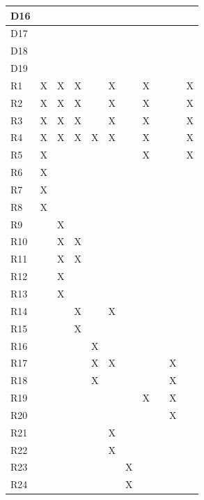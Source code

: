\documentclass{article}
\begin{document}
\begin{longtable}[c]{|m{0.15cm}|m{0.15cm}|m{0.15cm}|m{0.15cm}|m{0.15cm}|m{0.15cm}|m{0.15cm}|m{0.15cm}|m{0.15cm}|m{0.15cm}|m{0.15cm}|}
 \hline
 D16 &   &   &   &   &   &   &   &   &   &   \\
 \hline
 D17 &   &   &   &   &   &   &   &   &   &   \\
 \hline
 D18 &   &   &   &   &   &   &   &   &   &   \\
 \hline
 D19 &   &   &   &   &   &   &   &   &   &   \\
 \hline
 R1 & X & X & X &   & X &   & X &   &   & X \\
 \hline
 R2 & X & X & X &   & X &   & X &   &   & X \\
 \hline
 R3 & X & X & X &   & X &   & X &   &   & X \\
 \hline
 R4 & X & X & X & X & X &   & X &   &   & X \\
 \hline
 R5 & X &   &   &   &   &   & X &   &   & X \\
 \hline
 R6 & X &   &   &   &   &   &   &   &   &   \\
 \hline
 R7 & X &   &   &   &   &   &   &   &   &   \\
 \hline
 R8 & X &   &   &   &   &   &   &   &   &   \\
 \hline
 R9 &   & X &   &   &   &   &   &   &   &   \\
 \hline
 R10 &   & X & X &   &   &   &   &   &   &   \\
 \hline
 R11 &   & X & X &   &   &   &   &   &   &   \\
 \hline
 R12 &   & X &   &   &   &   &   &   &   &   \\
 \hline
 R13 &   & X &   &   &   &   &   &   &   &   \\
 \hline
 R14 &   &   & X &   & X &   &   &   &   &   \\
 \hline
 R15 &   &   & X &   &   &   &   &   &   &   \\
 \hline
 R16 &   &   &   & X &   &   &   &   &   &   \\
 \hline
 R17 &   &   &   & X & X &   &   &   & X &   \\
 \hline
 R18 &   &   &   & X &   &   &   &   & X &   \\
 \hline
 R19 &   &   &   &   &   &   & X &   & X &   \\
 \hline
 R20 &   &   &   &   &   &   &   &   & X &   \\
 \hline
 R21 &   &   &   &   & X &   &   &   &   &   \\
 \hline
 R22 &   &   &   &   & X &   &   &   &   &   \\
 \hline
 R23 &   &   &   &   &   & X &   &   &   &   \\
 \hline
 R24 &   &   &   &   &   & X &   &   &   &   \\

\end{longtable}
\end{document}
